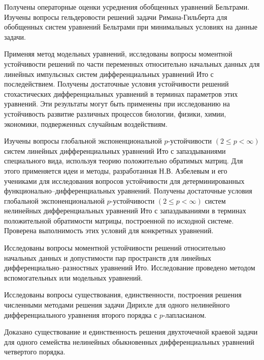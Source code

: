 Получены операторные оценки усреднения обобщенных уравнений Бельтрами. Изучены вопросы гельдеровости решений задачи Римана-Гильберта для обобщенных систем уравнений Бельтрами при минимальных условиях на данные задачи.






Применяя метод модельных уравнений, исследованы вопросы моментной устойчивости решений по части переменных относительно начальных данных для линейных импульсных систем  дифференциальных уравнений Ито с последействием.
Получены достаточные условия устойчивости решений стохастических дифференциальных уравнений в терминах параметров этих уравнений.  Эти результаты могут быть применены при исследованию на  устойчивость развитие различных процессов биологии, физики, химии, экономики, подверженных случайным воздействиям.


Изучены вопросы  глобальной экспоненциональной $p$-устойчивости $(2 \le p < \infty)$ систем линейных дифференциальных уравнений Ито с запаздываниями специального вида, используя теорию положительно обратимых матриц. Для этого применяется идеи и методы, разработанная Н.В. Азбелевым и его учениками для исследования вопросов устойчивости для детерминированных функционально--дифференциальных уравнений. Получены достаточные условия глобальной экспоненциональной $p$-устойчивости $(2 \le p < \infty)$ систем нелинейных  дифференциальных уравнений Ито с запаздываниями в терминах положительной обратимости матрицы, построенной по исходной системе. Проверена  выполнимость этих условий для конкретных уравнений.


Исследованы вопросы моментной устойчивости решений  относительно начальных данных и допустимости пар пространств для линейных дифференциально--разностных уравнений Ито. Исследование проведено методом вспомогательных или модельных уравнений.








Исследованы вопросы существования, единственности, построения решения численными методами решения задачи Дирихле для одного нелинейного дифференциального уравнения второго порядка с $p$-лапласианом.


Доказано существование и единственность решения двухточечной краевой задачи для одного семейства нелинейных обыкновенных дифференциальных уравнений четвертого порядка.


